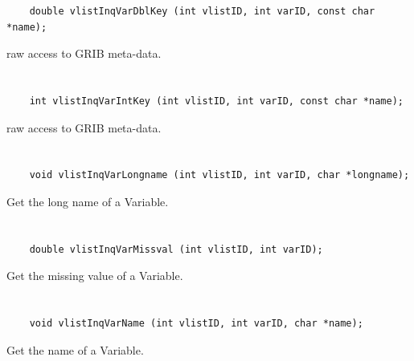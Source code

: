 \begin{verbatim}
    double vlistInqVarDblKey (int vlistID, int varID, const char *name);
\end{verbatim}

raw access to GRIB meta-data.


\section*{\tt {}}

\begin{verbatim}
    int vlistInqVarIntKey (int vlistID, int varID, const char *name);
\end{verbatim}

raw access to GRIB meta-data.


\section*{\tt {}}

\begin{verbatim}
    void vlistInqVarLongname (int vlistID, int varID, char *longname);
\end{verbatim}

Get the long name of a Variable.


\section*{\tt {}}

\begin{verbatim}
    double vlistInqVarMissval (int vlistID, int varID);
\end{verbatim}

Get the missing value of a Variable.


\section*{\tt {}}

\begin{verbatim}
    void vlistInqVarName (int vlistID, int varID, char *name);
\end{verbatim}

Get the name of a Variable.


\section*{\tt {}}


